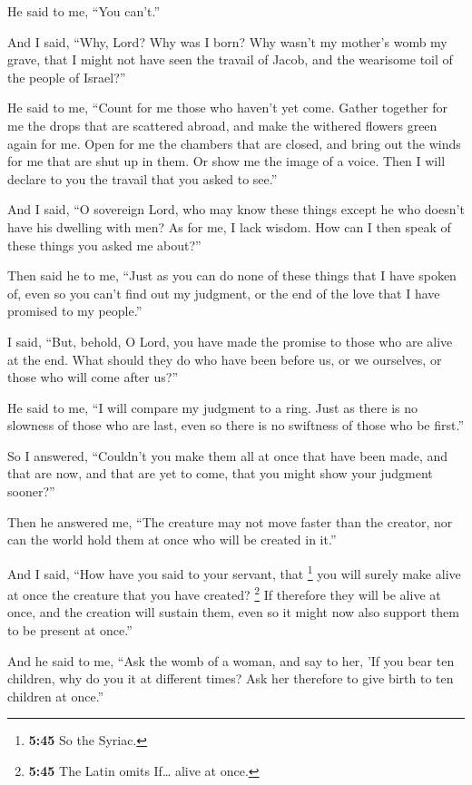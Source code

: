  He said to me, ``You can't.''

And I said, ``Why, Lord? Why was I born? Why wasn't my mother's womb my
grave, that I might not have seen the travail of Jacob, and the
wearisome toil of the people of Israel?''

 He said to me, ``Count for me those who haven't yet
come. Gather together for me the drops that are scattered abroad, and
make the withered flowers green again for me.  Open for
me the chambers that are closed, and bring out the winds for me that are
shut up in them. Or show me the image of a voice. Then I will declare to
you the travail that you asked to see.''

 And I said, ``O sovereign Lord, who may know these
things except he who doesn't have his dwelling with men? 
As for me, I lack wisdom. How can I then speak of these things you asked
me about?''

 Then said he to me, ``Just as you can do none of these
things that I have spoken of, even so you can't find out my judgment, or
the end of the love that I have promised to my people.''

 I said, ``But, behold, O Lord, you have made the promise
to those who are alive at the end. What should they do who have been
before us, or we ourselves, or those who will come after us?''

 He said to me, ``I will compare my judgment to a ring.
Just as there is no slowness of those who are last, even so there is no
swiftness of those who be first.''

 So I answered, ``Couldn't you make them all at once that
have been made, and that are now, and that are yet to come, that you
might show your judgment sooner?''

 Then he answered me, ``The creature may not move faster
than the creator, nor can the world hold them at once who will be
created in it.''

 And I said, ``How have you said to your servant, that
\footnote{\textbf{5:45} So the Syriac.} you will surely make alive at
once the creature that you have created? \footnote{\textbf{5:45} The
  Latin omits If\ldots{} alive at once.} If therefore they will be alive
at once, and the creation will sustain them, even so it might now also
support them to be present at once.''

 And he said to me, ``Ask the womb of a woman, and say to
her, 'If you bear ten children, why do you it at different times? Ask
her therefore to give birth to ten children at once.''


